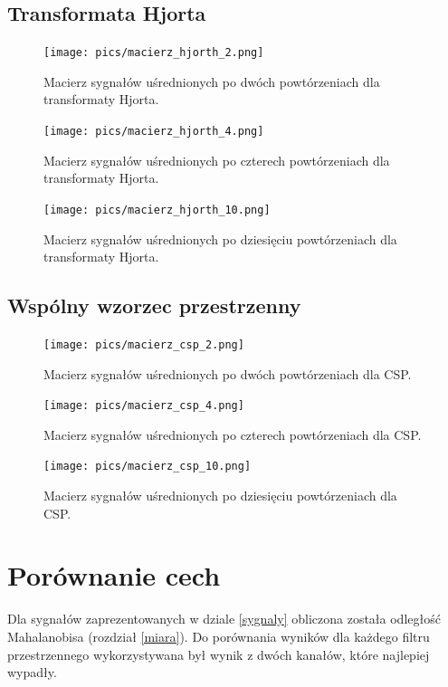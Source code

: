 \documentclass[licencjacka,openright]{pracamgr}
\begin{document}
\subsection{Transformata Hjorta}

\begin{figure}[H]
\centering
\texttt{[image: pics/macierz\_hjorth\_2.png]}
\caption{Macierz sygnałów uśrednionych po dwóch powtórzeniach dla transformaty Hjorta.}
\label{maciez_hjorth_2}
\end{figure}

\begin{figure}[H]
\centering
\texttt{[image: pics/macierz\_hjorth\_4.png]}
\caption{Macierz sygnałów uśrednionych po czterech powtórzeniach dla transformaty Hjorta.}
\label{maciez_hjorth_4}
\end{figure}

\begin{figure}[H]
\centering
\texttt{[image: pics/macierz\_hjorth\_10.png]}
\caption{Macierz sygnałów uśrednionych po dziesięciu powtórzeniach dla transformaty Hjorta.}
\label{maciez_hjorth_10}
\end{figure}

\subsection{Wspólny wzorzec przestrzenny}

\begin{figure}[H]
\centering
\texttt{[image: pics/macierz\_csp\_2.png]}
\caption{Macierz sygnałów uśrednionych po dwóch powtórzeniach dla CSP.}
\label{maciez_csp_2}
\end{figure}

\begin{figure}[H]
\centering
\texttt{[image: pics/macierz\_csp\_4.png]}
\caption{Macierz sygnałów uśrednionych po czterech powtórzeniach dla CSP.}
\label{maciez_csp_4}
\end{figure}

\begin{figure}[H]
\centering
\texttt{[image: pics/macierz\_csp\_10.png]}
\caption{Macierz sygnałów uśrednionych po dziesięciu powtórzeniach dla CSP.}
\label{maciez_csp_10}
\end{figure}


\section{Porównanie cech}
Dla sygnałów zaprezentowanych w dziale \ref{sygnaly} obliczona została odległość Mahalanobisa (rozdział \ref{miara}). Do porównania wyników dla każdego filtru przestrzennego wykorzystywana był wynik z dwóch kanałów, które najlepiej wypadły. 
\end{document}
